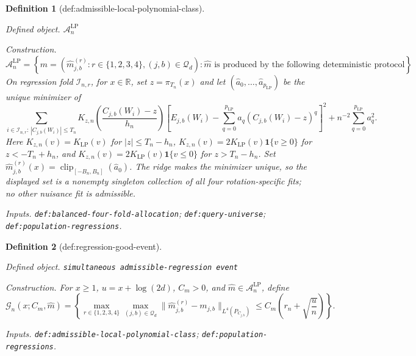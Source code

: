 \documentclass{article}
\newtheorem{definition}{Definition}
\begin{document}
\begin{definition}[def:admissible-local-polynomial-class]\label{def:admissible-local-polynomial-class}
\par\smallskip\noindent\emph{Defined object.} \(\mathcal A_n^{\mathrm{LP}}\)
\par\smallskip\noindent\emph{Construction.} \[\mathcal A_n^{\mathrm{LP}}=\left\{\widehat m=(\widehat m^{(r)}_{j,b}:r\in\{1,2,3,4\},(j,b)\in\mathcal Q_d):\widehat m\text{ is produced by the following deterministic protocol}\right\}.\] On regression fold \(\mathcal I_{n,r}\), for \(x\in\mathbb R\), set \(z=\pi_{T_n}(x)\) and let \((\widehat a_0,\ldots,\widehat a_{p_{\mathrm{LP}}})\) be the unique minimizer of \[\sum_{i\in\mathcal I_{n,r}:\,|C_{j,b}(W_i)|\le T_n}K_{z,n}\!\left(\frac{C_{j,b}(W_i)-z}{h_n}\right)\left[E_{j,b}(W_i)-\sum_{q=0}^{p_{\mathrm{LP}}}a_q(C_{j,b}(W_i)-z)^q\right]^2+n^{-2}\sum_{q=0}^{p_{\mathrm{LP}}}a_q^2.\] Here \(K_{z,n}(v)=K_{\mathrm{LP}}(v)\) for \(|z|\le T_n-h_n\), \(K_{z,n}(v)=2K_{\mathrm{LP}}(v)\mathbf 1\{v\ge0\}\) for \(z<-T_n+h_n\), and \(K_{z,n}(v)=2K_{\mathrm{LP}}(v)\mathbf 1\{v\le0\}\) for \(z>T_n-h_n\). Set \(\widehat m^{(r)}_{j,b}(x)=\operatorname{clip}_{[-B_n,B_n]}(\widehat a_0)\). The ridge makes the minimizer unique, so the displayed set is a nonempty singleton collection of all four rotation-specific fits; no other nuisance fit is admissible.
\par\smallskip\noindent\emph{Inputs.} \texttt{def:\allowbreak{}balanced-\allowbreak{}four-\allowbreak{}fold-\allowbreak{}allocation}; \texttt{def:\allowbreak{}query-\allowbreak{}universe}; \texttt{def:\allowbreak{}population-\allowbreak{}regressions}.
\end{definition}

\begin{definition}[def:regression-good-event]\label{def:regression-good-event}
\par\smallskip\noindent\emph{Defined object.} \texttt{simultaneous admissible-\allowbreak{}regression event}
\par\smallskip\noindent\emph{Construction.} For \(x\ge1\), \(u=x+\log(2d)\), \(C_m>0\), and \(\widehat m\in\mathcal A_n^{\mathrm{LP}}\), define \[\mathcal G_n(x;C_m,\widehat m)=\left\{\max_{r\in\{1,2,3,4\}}\max_{(j,b)\in\mathcal Q_d}\|\widehat m^{(r)}_{j,b}-m_{j,b}\|_{L^4(P_{C_{j,b}})}\le C_m\left(r_n+\sqrt{\frac{u}{n}}\right)\right\}.\]
\par\smallskip\noindent\emph{Inputs.} \texttt{def:\allowbreak{}admissible-\allowbreak{}local-\allowbreak{}polynomial-\allowbreak{}class}; \texttt{def:\allowbreak{}population-\allowbreak{}regressions}.
\end{definition}
\end{document}
